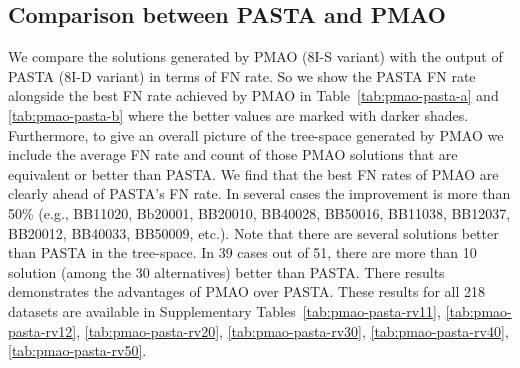 \subsection{Comparison between PASTA and PMAO}
We compare the solutions generated by PMAO (8I-S variant) with the output of PASTA (8I-D variant) in terms of FN rate. So we show the PASTA FN rate  alongside the best FN rate achieved by PMAO in Table~\ref{tab:pmao-pasta-a} and \ref{tab:pmao-pasta-b} where the better values are marked with darker shades. Furthermore, to give an overall picture of the tree-space generated by PMAO we include the average FN rate and count of those PMAO solutions that are equivalent or better than PASTA. We find that the best FN rates of PMAO are clearly ahead of PASTA's FN rate. In several cases the improvement is more than 50\% (e.g., BB11020, Bb20001, BB20010, BB40028, BB50016, BB11038, BB12037, BB20012, BB40033, BB50009, etc.). Note that there are several solutions better than PASTA in the tree-space. In 39 cases out of 51, there are more than 10 solution (among the 30 alternatives) better than PASTA. There results demonstrates the advantages of PMAO over PASTA. These results for all 218 datasets are available in Supplementary Tables~\ref{tab:pmao-pasta-rv11}, \ref{tab:pmao-pasta-rv12}, \ref{tab:pmao-pasta-rv20}, \ref{tab:pmao-pasta-rv30}, \ref{tab:pmao-pasta-rv40}, \ref{tab:pmao-pasta-rv50}.
